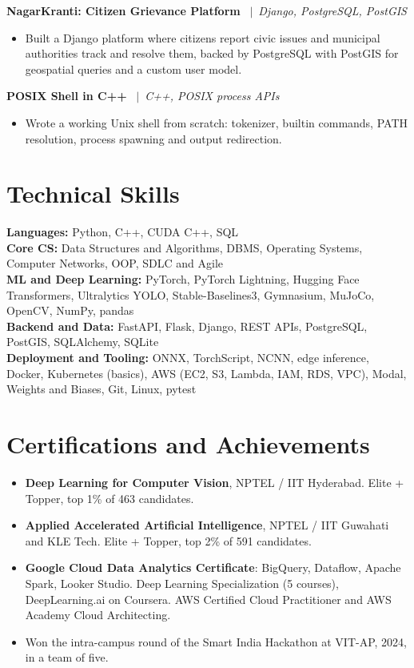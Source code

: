 \documentclass[a4paper,9pt]{extarticle}
\newcommand{\sep}{\ $\vert$\ }
\begin{document}
\textbf{NagarKranti: Citizen Grievance Platform} \sep \textit{Django, PostgreSQL, PostGIS}
\begin{itemize}
  \item Built a Django platform where citizens report civic issues and municipal authorities track and resolve them, backed by PostgreSQL with PostGIS for geospatial queries and a custom user model.
\end{itemize}
\vspace{3pt}

\textbf{POSIX Shell in C++} \sep \textit{C++, POSIX process APIs}
\begin{itemize}
  \item Wrote a working Unix shell from scratch: tokenizer, builtin commands, PATH resolution, process spawning and output redirection.
\end{itemize}

\section*{Technical Skills}
\textbf{Languages:} Python, C++, CUDA C++, SQL\\
\textbf{Core CS:} Data Structures and Algorithms, DBMS, Operating Systems, Computer Networks, OOP, SDLC and Agile\\
\textbf{ML and Deep Learning:} PyTorch, PyTorch Lightning, Hugging Face Transformers, Ultralytics YOLO, Stable-Baselines3, Gymnasium, MuJoCo, OpenCV, NumPy, pandas\\
\textbf{Backend and Data:} FastAPI, Flask, Django, REST APIs, PostgreSQL, PostGIS, SQLAlchemy, SQLite\\
\textbf{Deployment and Tooling:} ONNX, TorchScript, NCNN, edge inference, Docker, Kubernetes (basics), AWS (EC2, S3, Lambda, IAM, RDS, VPC), Modal, Weights and Biases, Git, Linux, pytest

\section*{Certifications and Achievements}
\begin{itemize}
  \item \textbf{Deep Learning for Computer Vision}, NPTEL / IIT Hyderabad. Elite + Topper, top 1\% of 463 candidates.
  \item \textbf{Applied Accelerated Artificial Intelligence}, NPTEL / IIT Guwahati and KLE Tech. Elite + Topper, top 2\% of 591 candidates.
  \item \textbf{Google Cloud Data Analytics Certificate}: BigQuery, Dataflow, Apache Spark, Looker Studio. Deep Learning Specialization (5 courses), DeepLearning.ai on Coursera. AWS Certified Cloud Practitioner and AWS Academy Cloud Architecting.
  \item Won the intra-campus round of the Smart India Hackathon at VIT-AP, 2024, in a team of five.
\end{itemize}
\end{document}
